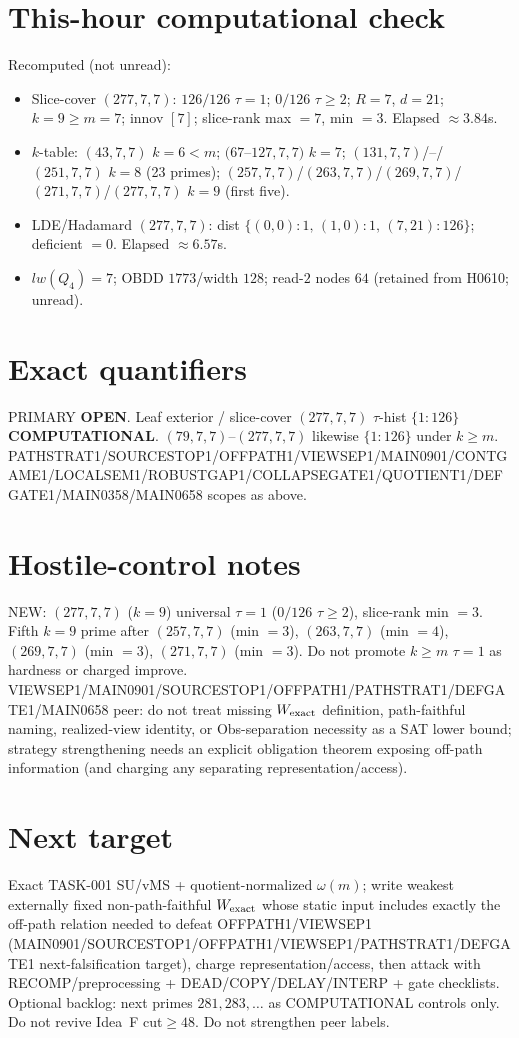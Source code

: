 \documentclass[11pt]{article}
\begin{document}
\section*{This-hour computational check}
Recomputed (not unread):
\begin{itemize}
\item Slice-cover $(277,7,7)$: $126/126$ $\tau{=}1$; $0/126$ $\tau{\ge}2$; $R{=}7$, $d{=}21$;
  $k{=}9{\ge}m{=}7$; innov $[7]$; slice-rank max $=7$, min $=3$. Elapsed $\approx3.84$s.
\item $k$-table: $(43,7,7)$ $k{=}6{<}m$; $(67$--$127,7,7)$ $k{=}7$;
  $(131,7,7)$/--/$(251,7,7)$ $k{=}8$ (23 primes); $(257,7,7)$/$(263,7,7)$/$(269,7,7)$/$(271,7,7)$/$(277,7,7)$ $k{=}9$ (first five).
\item LDE/Hadamard $(277,7,7)$: dist $\{(0,0){:}1,\,(1,0){:}1,\,(7,21){:}126\}$; deficient $=0$. Elapsed $\approx6.57$s.
\item $lw(Q_4)=7$; OBDD $1773$/width $128$; read-$2$ nodes $64$ (retained from H0610; unread).
\end{itemize}

\section*{Exact quantifiers}
PRIMARY \textbf{OPEN}. Leaf exterior / slice-cover $(277,7,7)$ $\tau$-hist $\{1{:}126\}$ \textbf{COMPUTATIONAL}.
$(79,7,7)$--$(277,7,7)$ likewise $\{1{:}126\}$ under $k{\ge}m$.
PATHSTRAT1/SOURCESTOP1/OFFPATH1/VIEWSEP1/MAIN0901/CONTGAME1/LOCALSEM1/ROBUSTGAP1/COLLAPSEGATE1/QUOTIENT1/DEFGATE1/MAIN0358/MAIN0658 scopes as above.

\section*{Hostile-control notes}
NEW: $(277,7,7)$ ($k{=}9$) universal $\tau{=}1$ ($0/126$ $\tau{\ge}2$), slice-rank min $=3$.
Fifth $k{=}9$ prime after $(257,7,7)$ (min $=3$), $(263,7,7)$ (min $=4$), $(269,7,7)$ (min $=3$), $(271,7,7)$ (min $=3$).
Do not promote $k{\ge}m$ $\tau{=}1$ as hardness or charged improve.
VIEWSEP1/MAIN0901/SOURCESTOP1/OFFPATH1/PATHSTRAT1/DEFGATE1/MAIN0658 peer: do not treat missing $W_{\rm exact}$ definition,
path-faithful naming, realized-view identity, or Obs-separation necessity as a SAT lower bound;
strategy strengthening needs an explicit obligation theorem exposing off-path information
(and charging any separating representation/access).

\section*{Next target}
Exact TASK-001 SU/vMS + quotient-normalized $\omega(m)$; write weakest externally fixed non-path-faithful
$W_{\rm exact}$ whose static input includes exactly the off-path relation needed to defeat OFFPATH1/VIEWSEP1
(MAIN0901/SOURCESTOP1/OFFPATH1/VIEWSEP1/PATHSTRAT1/DEFGATE1 next-falsification target), charge representation/access,
then attack with RECOMP/preprocessing + DEAD/COPY/DELAY/INTERP + gate checklists.
Optional backlog: next primes $281,283,\ldots$ as COMPUTATIONAL controls only.
Do not revive Idea~F cut$\ge48$. Do not strengthen peer labels.
\end{document}
